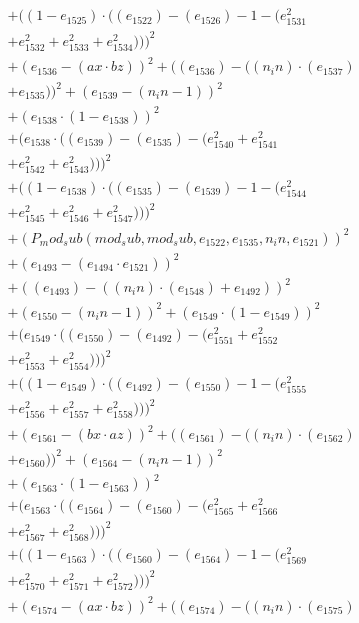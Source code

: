\documentclass[10pt, a4paper]{article}
\begin{document}
\begin{align*}
& + ((1 - e_{1525})  \cdot  ((e_{1522}) - (e_{1526}) - 1 - (e_{1531}^{2} \\
& + e_{1532}^{2} + e_{1533}^{2} + e_{1534}^{2})))^{2} \\
& + (e_{1536} - (ax  \cdot  bz))^{2} + ((e_{1536}) - ((n_in)  \cdot  (e_{1537}) \\
& + e_{1535}))^{2} + (e_{1539} - (n_in - 1))^{2} \\
& + (e_{1538}  \cdot  (1 - e_{1538}))^{2} \\
& + (e_{1538}  \cdot  ((e_{1539}) - (e_{1535}) - (e_{1540}^{2} + e_{1541}^{2} \\
& + e_{1542}^{2} + e_{1543}^{2})))^{2} \\
& + ((1 - e_{1538})  \cdot  ((e_{1535}) - (e_{1539}) - 1 - (e_{1544}^{2} \\
& + e_{1545}^{2} + e_{1546}^{2} + e_{1547}^{2})))^{2} \\
& + (P_mod_sub(mod_sub, mod_sub, e_{1522}, e_{1535}, n_in, e_{1521}))^{2} \\
& + (e_{1493} - (e_{1494}  \cdot  e_{1521}))^{2} \\
& + ((e_{1493}) - ((n_in)  \cdot  (e_{1548}) + e_{1492}))^{2} \\
& + (e_{1550} - (n_in - 1))^{2} + (e_{1549}  \cdot  (1 - e_{1549}))^{2} \\
& + (e_{1549}  \cdot  ((e_{1550}) - (e_{1492}) - (e_{1551}^{2} + e_{1552}^{2} \\
& + e_{1553}^{2} + e_{1554}^{2})))^{2} \\
& + ((1 - e_{1549})  \cdot  ((e_{1492}) - (e_{1550}) - 1 - (e_{1555}^{2} \\
& + e_{1556}^{2} + e_{1557}^{2} + e_{1558}^{2})))^{2} \\
& + (e_{1561} - (bx  \cdot  az))^{2} + ((e_{1561}) - ((n_in)  \cdot  (e_{1562}) \\
& + e_{1560}))^{2} + (e_{1564} - (n_in - 1))^{2} \\
& + (e_{1563}  \cdot  (1 - e_{1563}))^{2} \\
& + (e_{1563}  \cdot  ((e_{1564}) - (e_{1560}) - (e_{1565}^{2} + e_{1566}^{2} \\
& + e_{1567}^{2} + e_{1568}^{2})))^{2} \\
& + ((1 - e_{1563})  \cdot  ((e_{1560}) - (e_{1564}) - 1 - (e_{1569}^{2} \\
& + e_{1570}^{2} + e_{1571}^{2} + e_{1572}^{2})))^{2} \\
& + (e_{1574} - (ax  \cdot  bz))^{2} + ((e_{1574}) - ((n_in)  \cdot  (e_{1575}) \\

\end{align*}
\end{document}
